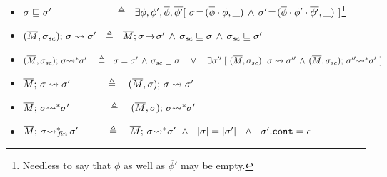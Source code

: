 {\begin{definition}
\begin{itemize}
\item
 $\EarlierS {\sigma}  {\sigma'} \ \ \ \ \ \  \ \ \ \ \ \ \ \ \ \  \ \ \  \triangleq \ \ %
 {\exists  \phi, \phi',\overline \phi, \overline {\phi'} [\  \sigma\!=\!({\overline \phi\cdot \phi},\_)\, \wedge\, \sigma'\!=\!(\overline \phi\cdot \phi'\cdot \overline {\phi'},\_)\ ] } $\footnote{Needless to say that   $\overline \phi$ as well as ${\overline {\phi'}}$ may be empty.}
\item
{ $(\overline{M}, \sigma_{sc});\, {\sigma} \rightsquigarrow \sigma'  \  \   \triangleq \ \    \overline{M};\sigma\! \rightarrow\! {\sigma'} \, \wedge\, 
  {\sigma_{sc}} \sqsubseteq {\sigma} \, \wedge\,   {\sigma_{sc}} \sqsubseteq {\sigma'} $}
\item
 $(\overline{M}, \sigma_{sc});\, {\sigma} {\rightsquigarrow^*} \sigma' \ \ \ \triangleq \ \  \sigma=\sigma' \, \wedge\,   {\sigma_{sc}} \sqsubseteq {\sigma}\  \ \ \vee
 \ \ \ \exists \sigma''.[\ (\overline{M}, \sigma_{sc});\, {\sigma} \rightsquigarrow \sigma'' \, \wedge\, 
(\overline{M}, \sigma_{sc});\, {\sigma''} {\rightsquigarrow^*} \sigma'\ ]$
 \item
{  $\overline{M};\, {\sigma} \rightsquigarrow \sigma' \ \  \ \ \ \ \   \,   \ \ \ \triangleq \ \ \  (\overline{M}, \sigma);\, {\sigma} \rightsquigarrow \sigma'$}
  \item
{  $\overline{M};\, {\sigma} {\rightsquigarrow^*} \sigma'   \ \ \ \ \ \ \,  \ \ \ \  \ \triangleq  \ \ \  (\overline{M}, \sigma);\, {\sigma} {\rightsquigarrow^*} \sigma'$}\ \  
\item
  $\overline{M};\, {\sigma} {\rightsquigarrow^*}\!\!_{\mathit{fin}}\, \sigma'   \ \ \ \ \  \,  \ \  \ \triangleq  \ \ \  \overline{M};\, {\sigma} {\rightsquigarrow^*} \sigma'  \ \wedge\ \
 {|\sigma| = |\sigma'| \ \ \wedge \ \ \sigma'.\mbox{\normalfont{\texttt{cont}}}=\epsilon  } $
 \end{itemize}
\end{definition}


}
